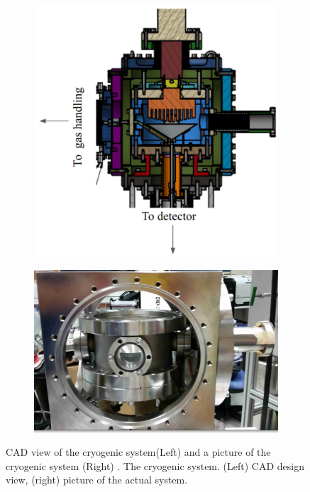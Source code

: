\begin{figure}[h]
\centering
\begin{subfigure}[c]{0.25\textheight}
\includegraphics[width=\textwidth]{cryoMirror.png}
\end{subfigure}
\begin{subfigure}[c]{0.25\textheight}
\includegraphics[width=\textwidth]{cryoOpenCrop.png}
\end{subfigure}
\caption{ CAD view of the cryogenic system(Left) and a picture of the cryogenic system (Right) . 
The cryogenic system. (Left) CAD design view, 
(right) picture of the actual system.
\label{fig:cryo}}
\end{figure}

